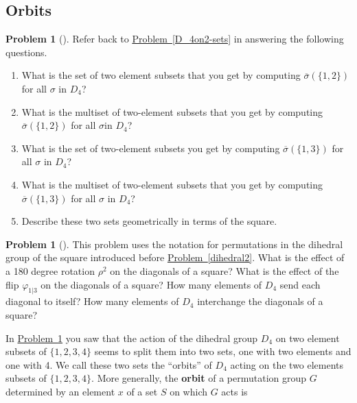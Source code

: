 \documentclass[10pt,]{book}
\newcommand{\terminology}[1]{\textbf{#1}}
\theoremstyle{plain}
\theoremstyle{definition}
\newtheorem{activity}[project]{Problem}
\theoremstyle{definition}
\numberwithin{equation}{chapter}
\begin{document}
\subsection[{Orbits}]{Orbits}\label{subsection-66}
\begin{activity}[] \label{orbits1}
\hypertarget{p-1629}{}%
Refer back to \hyperref[D_4on2-sets]{Problem~\ref{D_4on2-sets}} in answering the following questions.%
\begin{enumerate}[font=\bfseries,label=(\alph*),ref=\alph*]
\item\label{task-214} \marginsymbol[-2.5em]{} \hypertarget{p-1630}{}%
What is the set of two element subsets that you get by computing \(\overline{\sigma}(\{1,2\})\) for all \(\sigma\) in \(D_4\)?%
\item\label{task-215} \marginsymbol[-2.5em]{} \hypertarget{p-1632}{}%
What is the multiset of two-element subsets that you get by computing \(\overline{\sigma}(\{1,2\})\) for all \(\sigma\)in \(D_4\)?%
\item\label{task-216} \marginsymbol[-2.5em]{} \hypertarget{p-1634}{}%
What is the set of two-element subsets you get by computing \(\overline{\sigma}(\{1,3\})\) for all \(\sigma\) in \(D_4\)?%
\item\label{task-217} \marginsymbol[-2.5em]{} \hypertarget{p-1636}{}%
What is the multiset of two-element subsets that you get by computing \(\overline{\sigma}(\{1,3\})\) for all \(\sigma\) in \(D_4\)?%
\item\label{task-218} \marginsymbol[-2.5em]{} \hypertarget{p-1638}{}%
Describe these two sets geometrically in terms of the square.%
\end{enumerate}
\end{activity}
\begin{activity}[] \label{activity-288}
\hypertarget{p-1640}{}%
This problem uses the notation for permutations in the dihedral group of the square introduced before \hyperref[dihedral2]{Problem~\ref{dihedral2}}. What is the effect of a 180 degree rotation \(\rho^2\) on the diagonals of a square? What is the effect of the flip \(\varphi_{1|3}\) on the diagonals of a square? How many elements of \(D_4\) send each diagonal to itself? How many elements of \(D_4\) interchange the diagonals of a square?%
\end{activity}
\hypertarget{p-1642}{}%
In \hyperref[orbits1]{Problem~\ref{orbits1}} you saw that the action of the dihedral group \(D_4\) on two element subsets of \(\{1,2,3,4\}\) seems to split them into two sets, one with two elements and one with 4. We call these two sets the ``orbits'' of \(D_4\) acting on the two elements subsets of \(\{1,2,3,4\}\). More generally, the \terminology{orbit} of a permutation group \(G\) determined by an element \(x\) of a set \(S\) on which \(G\) acts is%
\end{document}

